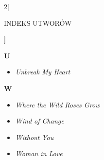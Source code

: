 \documentclass[a4paper]{report}
\begin{document}
\begin{multicols*}{2}[\begin{Huge}INDEKS UTWORÓW\end{Huge}\vspace{1cm}]
\begin{minipage}{\columnwidth}
\end{minipage}
\begin{minipage}{\columnwidth}
\begin{Large}
		\textbf{U}
	\end{Large} 
	\begin{itemize}[topsep=6pt, after=\vspace{5mm}, leftmargin=0mm]
		\itemsep0em
		\item[]\textit{Unbreak My Heart}  \\
	\end{itemize}
\end{minipage}
\begin{minipage}{\columnwidth}
\begin{Large}
		\textbf{W}
	\end{Large} 
	\begin{itemize}[topsep=6pt, after=\vspace{1.5mm}, leftmargin=0mm]
		\itemsep0em
		\item[]\textit{Where the Wild Roses Grow}  \\
		\item[]  \textit{Wind of Change}  \\
	\end{itemize}
\end{minipage}
\begin{minipage}{\columnwidth}
	\begin{itemize}[topsep=6pt, after=\vspace{5mm}, leftmargin=0mm]
		\itemsep0em
		\item[]  \textit{Without You}  \\
		\item[]  \textit{Woman in Love}  \\
	\end{itemize}
\end{minipage}



\end{multicols*}
\end{document}
